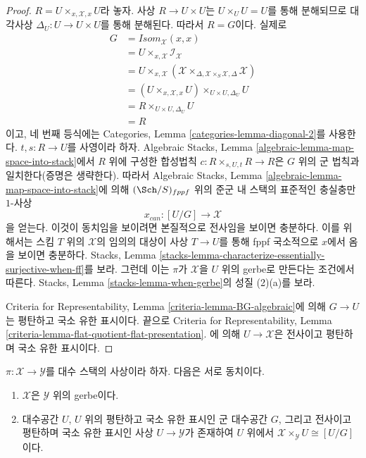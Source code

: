 \begin{proof}
$R = U \times_{x, \mathcal{X}, x} U$라 놓자. 사상 $R \to U \times U$는
$U \times_U U = U$를 통해 분해되므로 대각사상
$\Delta_U : U \to U \times U$를 통해 분해된다. 따라서 $R = G$이다.
실제로
\begin{align*}
G & = \mathit{Isom}_\mathcal{X}(x, x) \\
& = U \times_{x, \mathcal{X}} \mathcal{I}_\mathcal{X} \\
& = U \times_{x, \mathcal{X}}
(\mathcal{X}
\times_{\Delta, \mathcal{X} \times_S \mathcal{X}, \Delta}
\mathcal{X}) \\
& = (U \times_{x, \mathcal{X}, x} U) \times_{U \times U, \Delta_U} U \\
& = R \times_{U \times U, \Delta_U} U \\
& = R
\end{align*}
이고, 네 번째 등식에는 Categories, Lemma
\ref{categories-lemma-diagonal-2}를 사용한다. $t, s : R \to U$를
사영이라 하자. Algebraic Stacks, Lemma
\ref{algebraic-lemma-map-space-into-stack}에서 $R$ 위에 구성한 합성법칙
$c : R \times_{s, U, t} R \to R$은 $G$ 위의 군 법칙과 일치한다(증명은
생략한다). 따라서 Algebraic Stacks, Lemma
\ref{algebraic-lemma-map-space-into-stack}에 의해
$(\Sch/S)_{fppf}$ 위의 준군 내 스택의 표준적인 충실충만 $1$-사상
$$
x_{can} : [U/G] \longrightarrow \mathcal{X}
$$
을 얻는다. 이것이 동치임을 보이려면 본질적으로 전사임을 보이면
충분하다. 이를 위해서는 스킴 $T$ 위의 $\mathcal{X}$의 임의의 대상이
사상 $T \to U$를 통해 fppf 국소적으로 $x$에서 옴을 보이면 충분하다.
Stacks, Lemma
\ref{stacks-lemma-characterize-essentially-surjective-when-ff}를 보라.
그런데 이는 $\pi$가 $\mathcal{X}$을 $U$ 위의 gerbe로 만든다는 조건에서
따른다. Stacks, Lemma \ref{stacks-lemma-when-gerbe}의 성질 (2)(a)를 보라.

\medskip\noindent
Criteria for Representability, Lemma \ref{criteria-lemma-BG-algebraic}에
의해 $G \to U$는 평탄하고 국소 유한 표시이다. 끝으로 Criteria for
Representability, Lemma
\ref{criteria-lemma-flat-quotient-flat-presentation}.
에 의해 $U \to \mathcal{X}$은 전사이고 평탄하며 국소 유한 표시이다.
\end{proof}

\begin{lemma}
\label{lemma-local-structure-gerbe}
$\pi : \mathcal{X} \to \mathcal{Y}$를 대수 스택의 사상이라 하자. 다음은
서로 동치이다.
\begin{enumerate}
\item $\mathcal{X}$은 $\mathcal{Y}$ 위의 gerbe이다.
\item 대수공간 $U$, $U$ 위의 평탄하고 국소 유한 표시인 군 대수공간
$G$, 그리고 전사이고 평탄하며 국소 유한 표시인 사상
$U \to \mathcal{Y}$가 존재하여 $U$ 위에서
$\mathcal{X} \times_\mathcal{Y} U \cong [U/G]$이다.
\end{enumerate}
\end{lemma}

